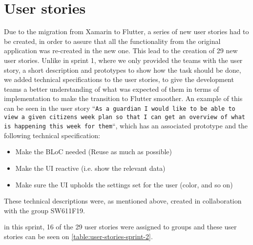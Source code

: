 \section{User stories}
Due to the migration from Xamarin to Flutter, a series of new user stories had to be created, in order to assure that all the functionality from the original application was re-created in the new one.
This lead to the creation of 29 new user stories.
Unlike in sprint 1, where we only provided the teams with the user story, a short description and prototypes to show how the task should be done, we added technical specifications to the user stories, to give the development teams a better understanding of what was expected of them in terms of implementation to make the transition to Flutter smoother.
An example of this can be seen in the user story ``\texttt{As a guardian I would like to be able to view a given citizens week plan so that I can get an overview of what is happening this week for them}``, which has an associated prototype and the following technical specification:

\begin{itemize}
    \item Make the BLoC needed (Reuse as much as possible)
    \item Make the UI reactive (i.e. show the relevant data)
    \item Make sure the UI upholds the settings set for the user (color, and so on)
\end{itemize}
These technical descriptions were, as mentioned above, created in collaboration with the group SW611F19.

\noindent in this sprint, 16 of the 29 user stories were assigned to groups and these user stories can be seen on \autoref{table:user-stories-sprint-2}.

